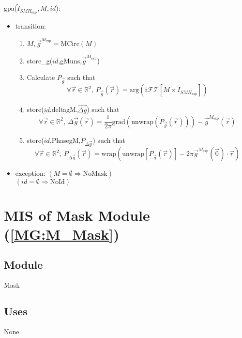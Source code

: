 \documentclass[12pt, titlepage]{article}
\begin{document}
\noindent gpa($\widetilde{I}_{\mathit{SMH}_{\text{exp}}},M,id$):
\begin{itemize} 
\item transition: 
	\begin{enumerate}
	\item $M,\overrightarrow{g}^{M_{\text{exp}}}=\text{MCirc}(M)$
	\item store{\_}g($id$,gMuns,$\overrightarrow{g}^{M_{\text{exp}}}$)
	\item Calculate $P_{\vec{g}}$ such that
	\begin{equation*}
	\forall \vec{r} \in \mathbb{R}^2, \ P_{\vec{g}}(\vec{r})=\text{arg}(i\mathcal{FT}[M\times\widetilde{I}_{\mathit{SMH}_{\text{exp}}}])
	\end{equation*}
	\item store($id$,deltagM,$\overrightarrow{\Delta g}$) such that
	\begin{equation*}
	\forall \vec{r} \in \mathbb{R}^2, \ \Delta \overrightarrow{g}(\vec{r})=\frac{1}{2\pi}\text{grad}(\text{unwrap}(P_{\vec{g}}(\vec{r})))-\overrightarrow{g}^{M_{\text{exp}}}(\vec{r})
	\end{equation*}
	\item store($id$,PhasegM,$P_{\Delta \vec{g}}$) such that
	\begin{equation*}
	\forall \vec{r} \in \mathbb{R}^2, \ P_{\Delta \vec{g}}(\vec{r})=\text{wrap}(\text{unwrap}[P_{\vec{g}}(\vec{r})]-2\pi\overrightarrow{g}^{M_{\text{exp}}}(\vec{0})\cdot \vec{r})
	\end{equation*}
	\end{enumerate}
\item exception:
\newline
$(M=\emptyset\Rightarrow\text{NoMask})$\\
 $(id=\emptyset\Rightarrow\text{NoId})$\\
\end{itemize}

\section{MIS of Mask Module (\texorpdfstring{\cref{MG:M_Mask}}))} \label{MIS_Mask}

\subsection{Module}
Mask
\subsection{Uses}
None
\end{document}

